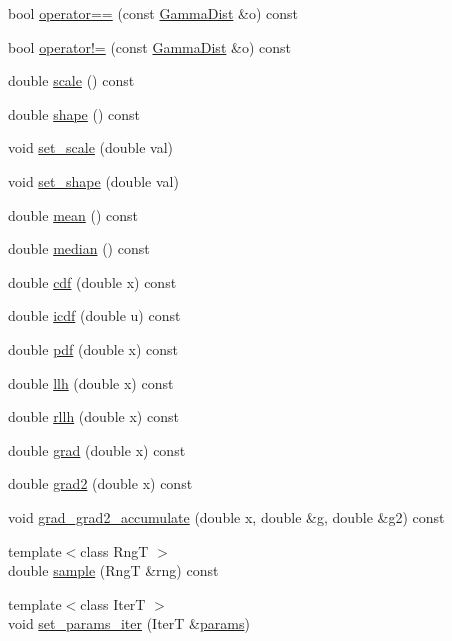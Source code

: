 \begin{DoxyCompactItemize}
\item 
bool \hyperlink{classprior__hessian_1_1GammaDist_adf7b3e2f37818570b47c63e24c907196}{operator==} (const \hyperlink{classprior__hessian_1_1GammaDist}{Gamma\+Dist} \&o) const 
\item 
bool \hyperlink{classprior__hessian_1_1GammaDist_ada35eef99d78f09260f7f0779edc4059}{operator!=} (const \hyperlink{classprior__hessian_1_1GammaDist}{Gamma\+Dist} \&o) const 
\item 
double \hyperlink{classprior__hessian_1_1GammaDist_a455e42461877165e4101f9f7f33ae84d}{scale} () const 
\item 
double \hyperlink{classprior__hessian_1_1GammaDist_a2c8b6939f7920e2e81532b5c1970567a}{shape} () const 
\item 
void \hyperlink{classprior__hessian_1_1GammaDist_a7560c2b0a336870b19240f6bea0eb023}{set\+\_\+scale} (double val)
\item 
void \hyperlink{classprior__hessian_1_1GammaDist_aea1effd3a5de08430650cc345312b8bd}{set\+\_\+shape} (double val)
\item 
double \hyperlink{classprior__hessian_1_1GammaDist_a1cab188d589b4062f3046f782ca338be}{mean} () const 
\item 
double \hyperlink{classprior__hessian_1_1GammaDist_a555e2d86894155eb89f59fd1acf727e2}{median} () const 
\item 
double \hyperlink{classprior__hessian_1_1GammaDist_abdc4e134ab9887665f063ba2031499e3}{cdf} (double x) const 
\item 
double \hyperlink{classprior__hessian_1_1GammaDist_a6a57fffb433fa1ac1284619c42651b46}{icdf} (double u) const 
\item 
double \hyperlink{classprior__hessian_1_1GammaDist_a39dfbff78fec9e25d9e2cdfaf0301b68}{pdf} (double x) const 
\item 
double \hyperlink{classprior__hessian_1_1GammaDist_ac823fcaa609dab7cb782ec63626b1529}{llh} (double x) const 
\item 
double \hyperlink{classprior__hessian_1_1GammaDist_a39fee270e1ff80a3125cfdfb4920adb9}{rllh} (double x) const 
\item 
double \hyperlink{classprior__hessian_1_1GammaDist_aa8ebf56666a40c3778462a6ff036b4e3}{grad} (double x) const 
\item 
double \hyperlink{classprior__hessian_1_1GammaDist_a56d9a1006a32bdb6184fc50e69327e5b}{grad2} (double x) const 
\item 
void \hyperlink{classprior__hessian_1_1GammaDist_a6e6149eb5bcf65a64c31f8b8dac5054c}{grad\+\_\+grad2\+\_\+accumulate} (double x, double \&g, double \&g2) const 
\item 
{\footnotesize template$<$class RngT $>$ }\\double \hyperlink{classprior__hessian_1_1GammaDist_a43b441f59ff1a5506110585ffde4adf3}{sample} (RngT \&rng) const 
\item 
{\footnotesize template$<$class IterT $>$ }\\void \hyperlink{classprior__hessian_1_1GammaDist_ace2701b4efc741de9c4ecf71f513b844}{set\+\_\+params\+\_\+iter} (IterT \&\hyperlink{classprior__hessian_1_1GammaDist_a8d30af8f996353fdae1d19a43bf6b016}{params})
\end{DoxyCompactItemize}
